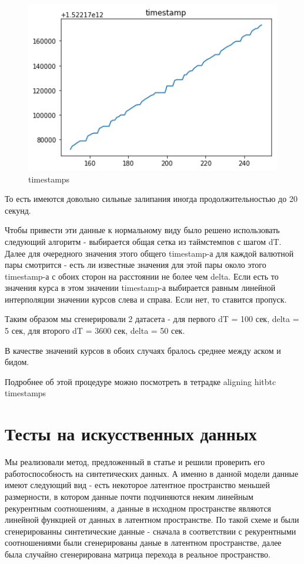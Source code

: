 \documentclass[11pt]{article}
\begin{document}
\begin{figure}[!htb]
\includegraphics[width = 15cm]{timestamp_hitbtc.png}
\caption{timestamps}
\label{fig:timestamp_hitbtc}
\end{figure} 

То есть имеются довольно сильные залипания иногда продолжительностью до 20 секунд. 

Чтобы привести эти данные к нормальному виду было решено использовать следующий алгоритм - выбирается общая сетка из таймстемпов с шагом dT. Далее для очередного значения этого общего timestamp-а для каждой валютной пары смотрится - есть ли известные значения для этой пары около этого timestamp-а с обоих сторон на расстоянии не более чем delta. Если есть то значения курса в этом значении timestamp-а выбирается равным линейной интерполяции значении курсов слева и справа. Если нет, то ставится пропуск.

Таким образом мы сгенерировали 2 датасета - для первого dT = 100 сек, delta = 5 сек, для второго dT = 3600 сек, delta = 50 сек. 

В качестве значений курсов в обоих случаях бралось среднее между аском и бидом. 

Подробнее об этой процедуре можно посмотреть в тетрадке aligning hitbtc timestamps

\section{Тесты на искусственных данных}
Мы реализовали метод, предложенный в статье и решили проверить его работоспособность на синтетических данных. А именно в данной модели данные имеют следующий вид - есть некоторое латентное пространство меньшей размерности, в котором данные почти подчиняются неким линейным рекурентным соотношениям, а данные в исходном пространстве являются линейной функцией от данных в латентном пространстве. По такой схеме и были сгенерированны синтетические данные - сначала в соответствии с рекурентными соотношениями были сгенерированы даные в латентном пространстве, далее была случайно сгенерирована матрица перехода в реальное пространство. 
\end{document}
